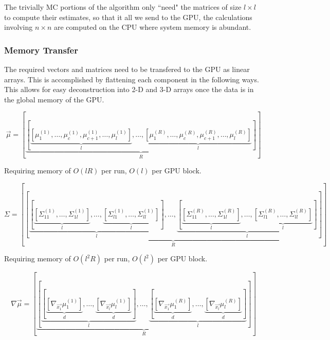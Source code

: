 \documentclass[phd,tocprelim]{cornell}
\begin{document}
The trivially MC portions of the algorithm only ``need" the matrices of size $l \times l$ to compute their estimates, so that it all we send to the GPU, the calculations involving $n \times n$ are computed on the CPU where system memory is abundant.

\subsubsection{Memory Transfer} %
\label{ssub:Memory Transfer}

The required vectors and matrices need to be transfered to the GPU as linear arrays. This is accomplished by flattening each component in the following ways. This allows for easy deconstruction into 2-D and 3-D arrays once the data is in the global memory of the GPU.

\begin{equation}
    \vec{\mu} = \left[ \underbrace{\left[ \underbrace{\left[\mu_{1}^{(1)}, \ldots, \mu_{c}^{(1)}, \mu_{c+1}^{(1)}, \ldots, \mu_{l}^{(1)} \right]}_{l}, \ldots, \underbrace{\left[\mu_{1}^{(R)}, \ldots, \mu_{c}^{(R)}, \mu_{c+1}^{(R)}, \ldots, \mu_{l}^{(R)} \right]}_{l} \right]}_{R} \right]
\end{equation}

Requiring memory of $O(lR)$ per run, $O(l)$ per GPU block.

\begin{equation}
    \Sigma = \left[ \underbrace{ \left[ \underbrace{ \left[ \underbrace{ \left[ \Sigma_{11}^{(1)}, \ldots, \Sigma_{1l}^{(1)} \right]}_{l}, \ldots, \underbrace{ \left[ \Sigma_{l1}^{(1)}, \ldots, \Sigma_{ll}^{(1)} \right]}_{l} \right] }_{l}, \ldots, \underbrace{ \left[ \underbrace{ \left[ \Sigma_{11}^{(R)}, \ldots, \Sigma_{1l}^{(R)} \right]}_{l}, \ldots, \underbrace{ \left[ \Sigma_{l1}^{(R)}, \ldots, \Sigma_{ll}^{(R)} \right]}_{l} \right] }_{l}  \right]}_{R}\right]
\end{equation}

Requiring memory of $O(l^{2}R)$ per run, $O(l^{2})$ per GPU block.

\begin{equation}
    \nabla \vec{\mu} = \left[ \underbrace{ \left[ \underbrace{ \left[ \underbrace{ \left[ \nabla_{\vec{x_{1}}} \mu_{1}^{(1)} \right]}_{d} , \ldots, \underbrace{ \left[ \nabla_{\vec{x_{l}}} \mu_{l}^{(1)} \right]}_{d}\right]}_{l}, \ldots, \underbrace{ \left[ \underbrace{ \left[ \nabla_{\vec{x_{1}}} \mu_{1}^{(R)} \right]}_{d} , \ldots, \underbrace{ \left[ \nabla_{\vec{x_{l}}} \mu_{l}^{(R)} \right]}_{d}\right]}_{l} \right]}_{R} \right]
\end{equation}
\end{document}
